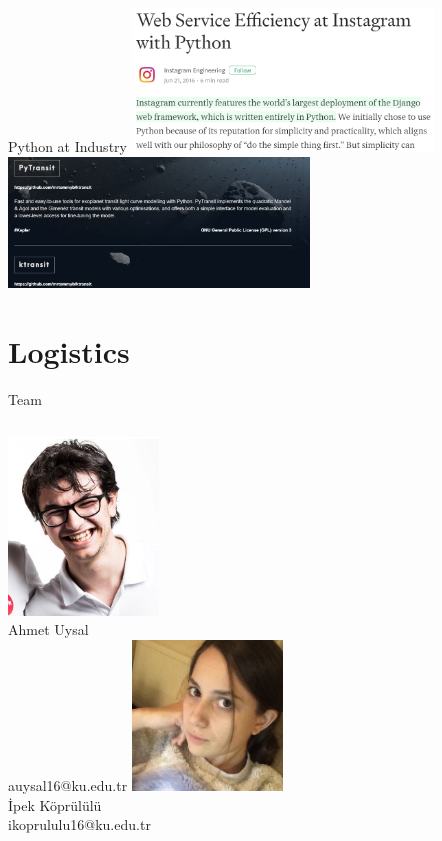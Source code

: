 	\begin{frame}{Python at Industry\cite{instagram_engineering}}
		\centering
		\includegraphics[width=0.6\textwidth]{images/instagram_python.PNG}
		\includegraphics[width=0.6\textwidth]{images/nasa_python.PNG}
	\end{frame}

	\section{Logistics}
		\begin{frame}{Team}
			\begin{columns}
				\column{5cm}
				\centering 
					\includegraphics[width=4.0cm]{images/ahmet.png}\\
					Ahmet Uysal\\
					auysal16@ku.edu.tr
				\column{5cm}
				\centering
					\includegraphics[width=4.0cm]{images/ipek.jpeg}\\
					İpek Köprülülü\\
					ikoprululu16@ku.edu.tr
			\end{columns}
		\end{frame}

